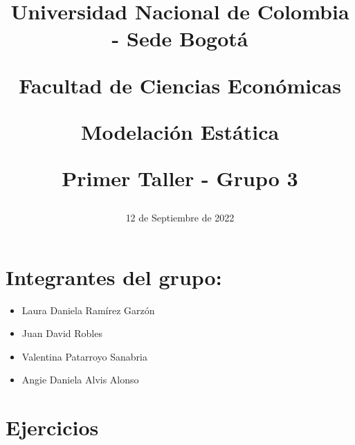 \documentclass[11pt,a4paper]{article}
\title{
Universidad Nacional de Colombia - Sede Bogotá

Facultad de Ciencias Económicas

Modelación Estática

Primer Taller - Grupo 3
}
\date{12 de Septiembre de 2022}
\begin{document}

\maketitle\thispagestyle{fancy}


\section{Integrantes del grupo:}

\begin{itemize}
\item Laura Daniela Ramírez Garzón
\item Juan David Robles
\item Valentina Patarroyo Sanabria
\item Angie Daniela Alvis Alonso
\end{itemize}

\section{Ejercicios}
\end{document}
